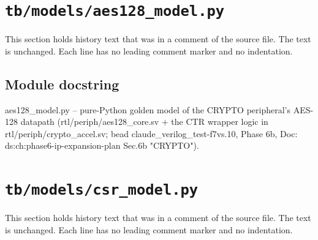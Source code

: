 \section{\texttt{tb/models/aes128\_model.py}}\label{cr:suite:aes128-model}

This section holds history text that was in a comment of the source file. The text is unchanged. Each line has no leading comment marker and no indentation.

\begin{record}

\subsection*{Module docstring}

\begin{textblock}
aes128_model.py -- pure-Python golden model of the CRYPTO peripheral's AES-128 datapath
(rtl/periph/aes128_core.sv + the CTR wrapper logic in rtl/periph/crypto_accel.sv; bead
claude_verilog_test-f7vs.10, Phase 6b, Doc: ds:ch:phase6-ip-expansion-plan Sec.6b "CRYPTO").
\end{textblock}

\end{record}

\section{\texttt{tb/models/csr\_model.py}}\label{cr:suite:csr-model}

This section holds history text that was in a comment of the source file. The text is unchanged. Each line has no leading comment marker and no indentation.

